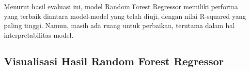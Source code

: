Menurut hasil evaluasi ini, model Random Forest Regressor memiliki performa yang terbaik diantara model-model yang telah diuji, dengan nilai R-squared yang paling tinggi. Namun, masih ada ruang untuk perbaikan, terutama dalam hal interpretabilitas model.

\subsection{Visualisasi Hasil Random Forest Regressor}
\lipsum[7-8]


